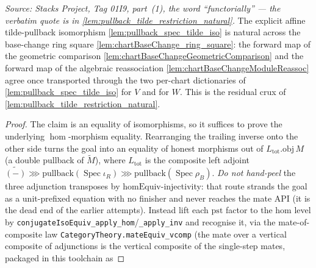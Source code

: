 \begin{lemma}
  \label{lem:pullback_spec_tilde_iso_ring_square_natural}
  \textit{Source: Stacks Project, Tag 01I9, part~(1), the word ``functorially''
  --- the verbatim quote is in \cref{lem:pullback_tilde_restriction_natural}.}
  The explicit affine tilde-pullback isomorphism \cref{lem:pullback_spec_tilde_iso} is natural across
  the base-change ring square \cref{lem:chartBaseChange_ring_square}: the forward map of the
  geometric comparison \cref{lem:chartBaseChangeGeometricComparison} and the forward map of the
  algebraic reassociation \cref{lem:chartBaseChangeModuleReassoc} agree once transported through the two
  per-chart dictionaries of \cref{lem:pullback_spec_tilde_iso} for \(V\) and for \(W\). This is the
  residual crux of \cref{lem:pullback_tilde_restriction_natural}.
  \begin{proof}
    The claim is an equality of isomorphisms, so it suffices to prove the underlying \(\hom\)-morphism
    equality. Rearranging the trailing inverse onto the other side turns the goal into an equality of
    honest morphisms out of \(L_{\mathrm{tot}}.\mathrm{obj}\,M\) (a double pullback of
    \(\widetilde M\)), where \(L_{\mathrm{tot}}\) is the composite left adjoint
    \(\widetilde{(-)} \ggg \text{pullback}(\operatorname{Spec}\iota_R) \ggg
    \text{pullback}(\operatorname{Spec}\rho_B)\). \emph{Do not hand-peel} the three adjunction transposes
    by \(\mathrm{homEquiv}\)-injectivity: that route strands the goal as a unit-prefixed equation with no
    finisher and never reaches the mate API (it is the dead end of the earlier attempts). Instead lift
    each \(\mathrm{pst}\) factor to the hom level by
    \texttt{conjugateIsoEquiv\_apply\_hom}/\texttt{\_apply\_inv} and recognise it, via the
    mate-of-composite law \texttt{CategoryTheory.mateEquiv\_vcomp} (the mate over a vertical composite
    of adjunctions is the vertical composite of the single-step mates, packaged in this toolchain as

\end{proof}
\end{lemma}
